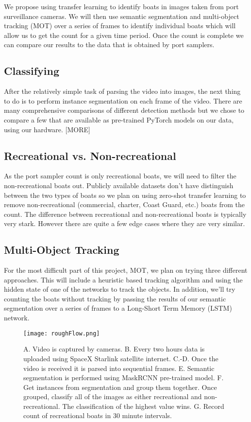 \documentclass[10pt,twocolumn,letterpaper]{article}
\begin{document}
We propose using transfer learning to identify boats in images taken from port surveillance cameras. We will then use semantic segmentation and multi-object tracking (MOT) over a series of frames to identify individual boats which will allow us to get the count for a given time period. Once the count is complete we can compare our results to the data that is obtained by port samplers.

\subsection{Classifying}

After the relatively simple task of parsing the video into images, the next thing to do is to perform instance segmentation on each frame of the video. There are many comprehensive comparisons of different detection methods \cite{pytorch_models} but we chose to compare a few that are available as pre-trained PyTorch models on our data, using our hardware. [MORE]

\subsection{Recreational vs. Non-recreational}

 As the port sampler count is only recreational boats, we will need to filter the non-recreational boats out. Publicly available datasets don't have distinguish between the two types of boats so we plan on using zero-shot transfer learning to remove non-recreational (commercial, charter, Coast Guard, etc.) boats from the count. The difference between recreational and non-recreational boats is typically very stark. However there are quite a few edge cases where they are very similar.

\subsection{Multi-Object Tracking}

For the most difficult part of this project, MOT, we plan on trying three different approaches. This will include a heuristic based tracking algorithm and using the hidden state of one of the networks to track the objects. In addition, we'll try counting the boats without tracking by passing the results of our semantic segmentation over a series of frames to a Long-Short Term Memory (LSTM) network.

\begin{figure*}[t]
  \centering
    \texttt{[image: roughFlow.png]}
    \caption{A. Video is captured by cameras. B. Every two hours data is uploaded using SpaceX Starlink satellite internet. C.-D. Once the video is received it is parsed into sequential frames. E. Semantic segmentation is performed using MaskRCNN pre-trained model. F. Get instances from segmentation and group them together. Once grouped, classify all of the images as either recreational and non-recreational. The classification of the highest value wins. G. Record count of recreational boats in 30 minute intervals.}
    \label{fig:pipline}
  \hfill
\end{figure*}
\end{document}
